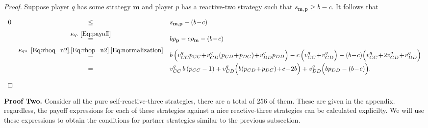\documentclass{article}
\theoremstyle{definition}
\begin{document}
\begin{proof}
Suppose player $q$ has some strategy $\mathbf{m}$ and player $p$ has a reactive-two
strategy such that $s_{\mathbf{m}, \mathbf{p}} \ge b\!-\!c$. It follows that

\begin{equation}
\begin{array}{rcl}
0 	&\le	&s_{\mathbf{m}, \mathbf{p}}-(b\!-\!c)\\[0.2cm]
	&\stackrel{Eq.~\eqref{Eq:payoff}}{=}	&b\rho_\mathbf{p} - c\rho_\mathbf{m}-(b\!-\!c)\\[0.2cm]
	&\stackrel{Eqs.~\eqref{Eq:rhoq_n2}, \eqref{Eq:rhop_n2}, \eqref{Eq:normalization}}{=}	&b\,\Big( v^q_{CC} p_{CC} \!+\!  v^q_{CD}(p_{CD}\!+\!p_{DC}) \!+\! v^q_{DD} p_{DD}\Big) 
		- c\,\Big(v^q_{CC} \!+\! v^q_{CD}\Big) - (b\!-\!c)\Big(v^q_{CC} \!+\!  2v^q_{CD} \!+\! v^q_{DD}\Big)\\[0.2cm]
	&=	&v^q_{CC} \,b\,(p_{CC}-1) + v^q_{CD}\Big(b(p_{CD}\!+\!p_{DC})\!+\!c\!-\!2b\Big) + v^q_{DD}\Big(bp_{DD}-(b\!-\!c)\Big).
\end{array}
\end{equation}

\end{proof}

{\bf Proof Two.} Consider all the pure self-reactive-three strategies, there
are a total of 256 of them. These are given in the appendix. regardless, the
payoff expressions for each of these strategies against a nice reactive-three
strategies can be calculated explicilty. We will use these expressions to
obtain the conditions for partner strategies similar to the previous subsection.
\end{document}
